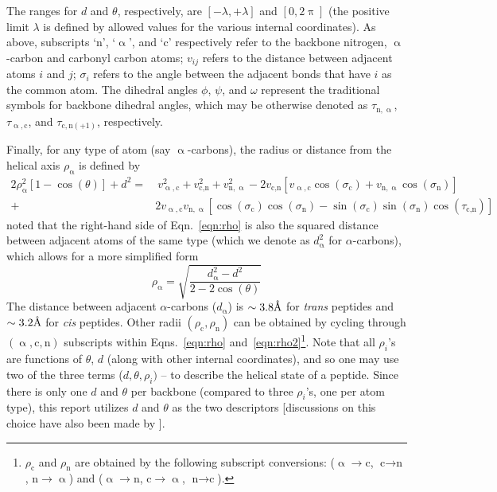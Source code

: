 \documentclass[fleqn,10pt,lineno]{wlpeerj} %
\newcommand{\n}[1]{{\color{blue}#1}}
\newcommand{\Eqn}[1]{Eqn.~\ref{#1}}
\newcommand{\Eqns}[1]{Eqns.~\ref{#1}}
\newcommand{\cis}{{\em cis}\xspace}
\newcommand{\trans}{{\em trans}\xspace}
\begin{document}
\n{The ranges for $d$ and $\theta$, respectively, are $[-\lambda,+\lambda]$ and $[0,2\uppi]$ (the positive limit $\lambda$ is defined by allowed values for the various internal coordinates).} As above, subscripts `$\textrm{n}$', `$\upalpha$', and `$\textrm{c}$' respectively refer to the backbone nitrogen, $\upalpha$-carbon and carbonyl carbon atoms; $v_{ij}$ refers to the distance between adjacent atoms $i$ and $j$; $\sigma_i$ refers to the angle between the adjacent bonds that have $i$ as the common atom. The dihedral angles $\phi$, $\psi$, and $\omega$ represent the traditional  symbols for backbone dihedral angles, which may be otherwise denoted as $\tau_{\textrm{n},\upalpha}$, $\tau_{\upalpha,\textrm{c}}$, and $\tau_{\textrm{c},\textrm{n}(+1)}$, respectively. 

\n{Finally, for any type of atom (say $\upalpha$-carbons), the radius or distance from the helical axis $\rho_\upalpha$ is defined by
\begin{align} 
2 \rho_\upalpha^2 \left[1 - \cos(\theta)\right] + d^2 = & ~v_{\upalpha,\textrm{c}}^2 + v_{\textrm{c},\textrm{n}}^2 + v_{\textrm{n},\upalpha}^2 - 2 v_{\textrm{c},\textrm{n}}\left[v_{\upalpha,\textrm{c}}\cos(\sigma_\textrm{c}) + v_{\textrm{n},\upalpha}\cos(\sigma_\textrm{n})\right] \nonumber \\
                                                  + & 2 v_{\upalpha,\textrm{c}} v_{\textrm{n},\upalpha}\left[\cos(\sigma_\textrm{c})\cos(\sigma_\textrm{n}) - \sin(\sigma_\textrm{c})\sin(\sigma_\textrm{n})\cos(\tau_{\textrm{c},\textrm{n}})\right]
\label{eqn:rho}
\end{align}
\cite{Miyazawa1961} noted that the right-hand side of \Eqn{eqn:rho} is also the squared distance between adjacent atoms of the same type (which we denote as $d_\upalpha^2$ for $\alpha$-carbons), which allows for a more simplified form
\begin{equation}
\label{eqn:rho2}
\rho_\upalpha = \sqrt{\frac{d_\upalpha^2 - d^2}{2-2\cos(\theta)}}
\end{equation}
The distance between adjacent $\alpha$-carbons ($d_\upalpha$) is $\sim 3.8\textrm\AA$ for \trans peptides and $\sim 3.2\textrm\AA$ for \cis peptides. Other radii $(\rho_\textrm{c}, \rho_\textrm{n})$ can be obtained by cycling through $(\upalpha,\textrm{c},\textrm{n})$ subscripts within \Eqns{eqn:rho} and~\ref{eqn:rho2}\footnote{$\rho_\textrm{c}$ and $\rho_\textrm{n}$ are obtained by the following subscript conversions: ($\upalpha \to \textrm{c}$, $\textrm{c} \to \textrm{n}$, $\textrm{n} \to \upalpha$) and ($\upalpha \to \textrm{n}$, $\textrm{c} \to \upalpha$, $\textrm{n} \to \textrm{c}$).}. Note that all $\rho_i$'s are functions of $\theta$, $d$ (along with other internal coordinates), and so one may use two of the three terms ($d,\theta,\rho_i)$ -- to describe the helical state of a peptide. Since there is only one $d$ and $\theta$ per backbone (compared to three $\rho_i$'s, one per atom type), this report utilizes $d$ and $\theta$ as the two descriptors [discussions on this choice have also been made by \cite{Zacharias2013}].}
\end{document}
